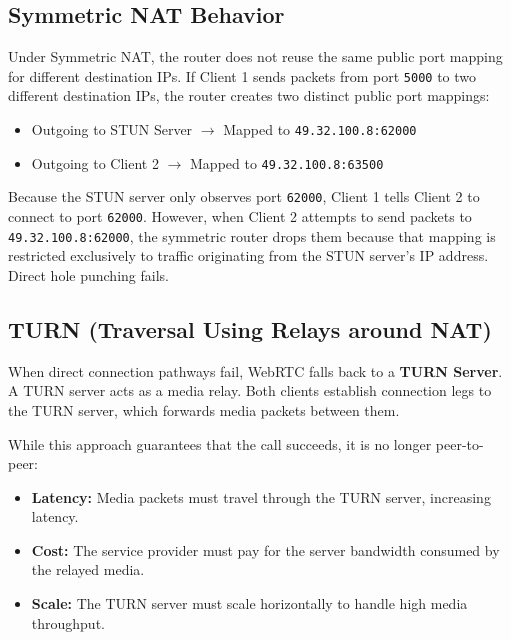 \documentclass[11pt,a4paper]{article}
\begin{document}
\subsection{Symmetric NAT Behavior}
Under Symmetric NAT, the router does not reuse the same public port mapping for different destination IPs. If Client 1 sends packets from port \texttt{5000} to two different destination IPs, the router creates two distinct public port mappings:
\begin{itemize}
    \item Outgoing to STUN Server $\rightarrow$ Mapped to \texttt{49.32.100.8:62000}
    \item Outgoing to Client 2 $\rightarrow$ Mapped to \texttt{49.32.100.8:63500}
\end{itemize}
Because the STUN server only observes port \texttt{62000}, Client 1 tells Client 2 to connect to port \texttt{62000}. However, when Client 2 attempts to send packets to \texttt{49.32.100.8:62000}, the symmetric router drops them because that mapping is restricted exclusively to traffic originating from the STUN server's IP address. Direct hole punching fails.

\subsection{TURN (Traversal Using Relays around NAT)}
When direct connection pathways fail, WebRTC falls back to a \textbf{TURN Server}. A TURN server acts as a media relay. Both clients establish connection legs to the TURN server, which forwards media packets between them.

While this approach guarantees that the call succeeds, it is no longer peer-to-peer:
\begin{itemize}
    \item \textbf{Latency:} Media packets must travel through the TURN server, increasing latency.
    \item \textbf{Cost:} The service provider must pay for the server bandwidth consumed by the relayed media.
    \item \textbf{Scale:} The TURN server must scale horizontally to handle high media throughput.
\end{itemize}
\end{document}
